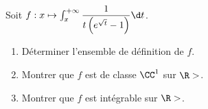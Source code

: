 \begin{enonce}
\begin{exercise}[ID={RMS124 E677 Mines-Ponts},subtitle={},tags={}]
Soit $f:x\mapsto \int_x^{+\infty} \dfrac{1}{t\left( e^{\sqrt{t}} - 1 \right)}\d t$.
\begin{enumerate}
  \item Déterminer l'ensemble de définition de $f$.
  \item Montrer que $f$ est de classe $\CC^1$ sur $\R>$.
  \item Montrer que $f$ est intégrable sur $\R>$.
\end{enumerate}
\end{exercise}
\begin{solution}
\end{solution}
\end{enonce}
